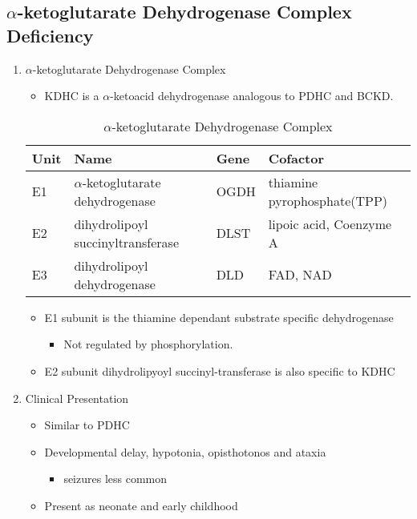 \documentclass{scrartcl}
\begin{document}
\subsection{\(\alpha\)-ketoglutarate Dehydrogenase Complex Deficiency}
\label{sec:org7beb07d}
\begin{enumerate}
\item \(\alpha\)-ketoglutarate Dehydrogenase Complex
\label{sec:orgdaebb3b}
\begin{itemize}
\item KDHC is a \(\alpha\)-ketoacid dehydrogenase analogous to PDHC and BCKD.
\end{itemize}


\begin{table}[htbp]
\caption{\label{tab:org4f46227}
\(\alpha\)-ketoglutarate Dehydrogenase Complex}
\centering
\begin{tabular}{llll}
Unit & Name & Gene & Cofactor\\
\hline
E1 & \(\alpha\)-ketoglutarate dehydrogenase & OGDH & thiamine pyrophosphate(TPP)\\
E2 & dihydrolipoyl succinyltransferase & DLST & lipoic acid, Coenzyme A\\
E3 & dihydrolipoyl dehydrogenase & DLD & FAD, NAD\\
\end{tabular}
\end{table}

\begin{itemize}
\item E1 subunit is the thiamine dependant substrate specific dehydrogenase
\begin{itemize}
\item Not regulated by phosphorylation.
\end{itemize}
\item E2 subunit dihydrolipyoyl succinyl-transferase is also specific to KDHC
\end{itemize}

\item Clinical Presentation
\label{sec:orgc2b482e}
\begin{itemize}
\item Similar to PDHC
\item Developmental delay, hypotonia, opisthotonos and ataxia
\begin{itemize}
\item seizures less common
\end{itemize}
\item Present as neonate and early childhood
\end{itemize}


\end{enumerate}
\end{document}
